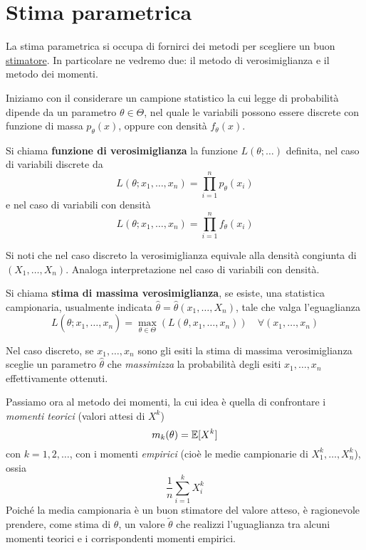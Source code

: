 \section{Stima parametrica}
La stima parametrica si occupa di fornirci dei metodi per scegliere un buon
\hyperref[def: stimatore]{stimatore}. In particolare ne vedremo due: il metodo di verosimiglianza
e il metodo dei momenti.

Iniziamo con il considerare un campione statistico la cui legge di probabilità dipende da un
parametro $\theta \in \Theta$, nel quale le variabili possono essere discrete con funzione di
massa $p_\theta(x)$, oppure con densità $f_\theta(x)$.

\begin{definition}
	Si chiama \textbf{funzione di verosimiglianza} la funzione $L(\theta; \dots)$ definita, nel
	caso di variabili discrete da
	\[ L(\theta; x_1, \ldots, x_n) = \prod_{i=1}^n p_\theta(x_i) \]
	e nel caso di variabili con densità
	\[ L(\theta; x_1, \ldots, x_n) = \prod_{i=1}^n f_\theta(x_i) \]
\end{definition}

Si noti che nel caso discreto la verosimiglianza equivale alla densità congiunta di
$(X_1, \dots, X_n)$. Analoga interpretazione nel caso di variabili con densità.

\begin{definition}
	Si chiama \textbf{stima di massima verosimiglianza}, se esiste, una statistica campionaria,
	usualmente indicata $\hat{\theta} = \hat{\theta} (x_1, \dots, X_n)$, tale che valga
	l'eguaglianza
	\[
		L(\hat{\theta}; x_1, \dots, x_n) = \max_{\theta \in \Theta} (L(\theta, x_1, \dots, x_n))
		\quad \forall (x_1, \dots, x_n)
	\]
\end{definition}

Nel caso discreto, se $x_1, \dots, x_n$ sono gli esiti la stima di massima verosimiglianza sceglie
un parametro $\hat{\theta}$ che \emph{massimizza} la probabilità degli esiti $x_1, \dots, x_n$
effettivamente ottenuti.

Passiamo ora al metodo dei momenti, la cui idea è quella di confrontare i \emph{momenti teorici}
(valori attesi di $X^k$)
\[ m_k(\theta) = \mathbb{E}[X^k] \]
con $k =1,2,\dots$, con i momenti \emph{empirici} (cioè le medie campionarie di
$X_1^k, \dots, X_n^k$), ossia
\[ \frac{1}{n} \sum_{i=1}^k X_i^k \]
Poiché la media campionaria è un buon stimatore del valore atteso, è ragionevole prendere, come
stima di $\theta$, un valore $\tilde{\theta}$ che realizzi l'uguaglianza tra alcuni momenti teorici
e i corrispondenti momenti empirici.

